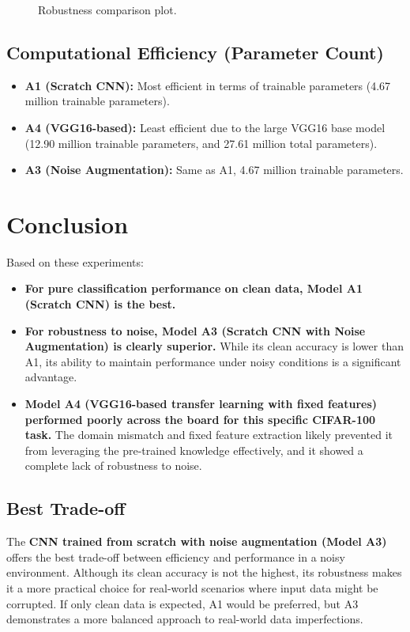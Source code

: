 \documentclass{article}
\begin{document}
\begin{figure}[htbp]
    \centering
    \caption{Robustness comparison plot.}
    \label{fig:robustness_plot}
\end{figure}

\subsection*{Computational Efficiency (Parameter Count)}
\begin{itemize}
    \item \textbf{A1 (Scratch CNN):} Most efficient in terms of trainable parameters (4.67 million trainable parameters).
    \item \textbf{A4 (VGG16-based):} Least efficient due to the large VGG16 base model (12.90 million trainable parameters, and 27.61 million total parameters).
    \item \textbf{A3 (Noise Augmentation):} Same as A1, 4.67 million trainable parameters.
\end{itemize}

\section*{Conclusion}

Based on these experiments:
\begin{itemize}
    \item \textbf{For pure classification performance on clean data, Model A1 (Scratch CNN) is the best.}
    \item \textbf{For robustness to noise, Model A3 (Scratch CNN with Noise Augmentation) is clearly superior.} While its clean accuracy is lower than A1, its ability to maintain performance under noisy conditions is a significant advantage.
    \item \textbf{Model A4 (VGG16-based transfer learning with fixed features) performed poorly across the board for this specific CIFAR-100 task.} The domain mismatch and fixed feature extraction likely prevented it from leveraging the pre-trained knowledge effectively, and it showed a complete lack of robustness to noise.
\end{itemize}

\subsection*{Best Trade-off}
The \textbf{CNN trained from scratch with noise augmentation (Model A3)} offers the best trade-off between efficiency and performance in a noisy environment. Although its clean accuracy is not the highest, its robustness makes it a more practical choice for real-world scenarios where input data might be corrupted. If only clean data is expected, A1 would be preferred, but A3 demonstrates a more balanced approach to real-world data imperfections.
\end{document}
